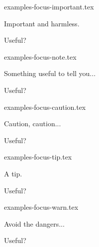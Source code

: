 \begin{filecontents*}[overwrite]{examples-focus-important.tex}
\begin{tdocimp}
    Important and harmless.
\end{tdocimp}

\begin{tdocimp}
    Useful?
\end{tdocimp}
\end{filecontents*}


\begin{filecontents*}[overwrite]{examples-focus-note.tex}
\begin{tdocnote}
    Something useful to tell you...
\end{tdocnote}

\begin{tdocnote}
    Useful?
\end{tdocnote}
\end{filecontents*}


\begin{filecontents*}[overwrite]{examples-focus-caution.tex}
\begin{tdoccaution}
    Caution, caution...
\end{tdoccaution}

\begin{tdoccaution}
    Useful?
\end{tdoccaution}
\end{filecontents*}


\begin{filecontents*}[overwrite]{examples-focus-tip.tex}
\begin{tdoctip}
    A tip.
\end{tdoctip}

\begin{tdoctip}
    Useful?
\end{tdoctip}
\end{filecontents*}


\begin{filecontents*}[overwrite]{examples-focus-warn.tex}
\begin{tdocwarn}
    Avoid the dangers...
\end{tdocwarn}

\begin{tdocwarn}
    Useful?
\end{tdocwarn}
\end{filecontents*}


